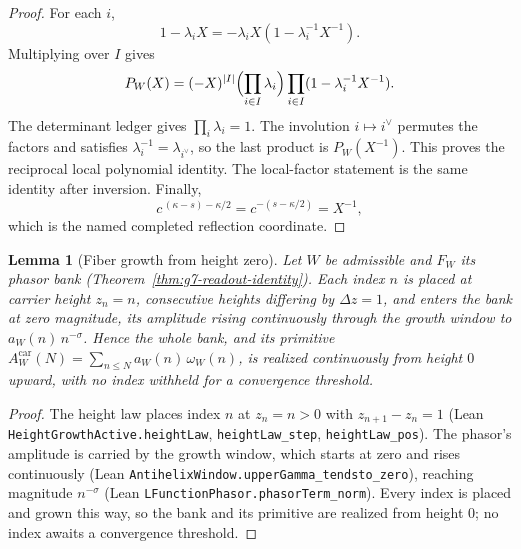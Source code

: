 \documentclass[11pt]{article}
\newtheorem{lemma}[theorem]{Lemma}
\theoremstyle{definition}
\begin{document}
\begin{proof}
For each \(i\),
\[
1-\lambda_iX=-\lambda_iX(1-\lambda_i^{-1}X^{-1}).
\]
Multiplying over \(I\) gives
\[
P_W(X)=(-X)^{|I|}\Bigl(\prod_{i\in I}\lambda_i\Bigr)
\prod_{i\in I}(1-\lambda_i^{-1}X^{-1}).
\]
The determinant ledger gives \(\prod_i\lambda_i=1\).  The involution
\(i\mapsto i^\vee\) permutes the factors and satisfies
\(\lambda_i^{-1}=\lambda_{i^\vee}\), so the last product is
\(P_W(X^{-1})\).  This proves the reciprocal local polynomial identity.  The
local-factor statement is the same identity after inversion.  Finally,
\[
c^{\,(\kappa-s)-\kappa/2}=c^{-(s-\kappa/2)}=X^{-1},
\]
which is the named completed reflection coordinate.
\end{proof}

\begin{lemma}[Fiber growth from height zero]\label{lem:g9-fiber-growth}
Let \(W\) be admissible and \(F_W\) its phasor bank
(Theorem~\ref{thm:g7-readout-identity}).  Each index \(n\) is placed at carrier
height \(z_n=n\), consecutive heights differing by \(\Delta z=1\), and enters
the bank at zero magnitude, its amplitude rising continuously through the
growth window to \(a_W(n)\,n^{-\sigma}\).  Hence the whole bank, and its
primitive \(A^{\mathrm{car}}_W(N)=\sum_{n\le N}a_W(n)\,\omega_W(n)\), is realized
continuously from height \(0\) upward, with no index withheld for a convergence
threshold.
\end{lemma}

\begin{proof}
The height law places index \(n\) at \(z_n=n>0\) with \(z_{n+1}-z_n=1\) (Lean
\texttt{HeightGrowthActive.heightLaw}, \texttt{heightLaw\_step},
\texttt{heightLaw\_pos}).  The phasor's amplitude is carried by the growth
window, which starts at zero and rises continuously (Lean
\texttt{AntihelixWindow.upperGamma\_tendsto\_zero}), reaching magnitude
\(n^{-\sigma}\) (Lean \texttt{LFunctionPhasor.phasorTerm\_norm}).  Every index is
placed and grown this way, so the bank and its primitive are realized from
height \(0\); no index awaits a convergence threshold.
\end{proof}
\end{document}
